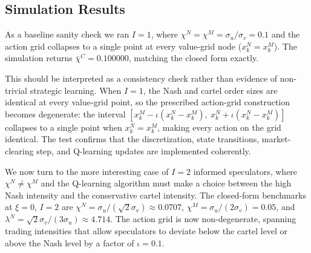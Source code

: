 \documentclass[11pt]{article}
\begin{document}
\subsection{Simulation Results}
As a baseline sanity check we ran $I=1$, where $\chi^N=\chi^M=\sigma_u/\sigma_v=0.1$ 
and the action grid collapses to a single point at every value-grid node 
($x_k^N=x_k^M$). The simulation returns $\bar\chi^C=0.100000$, matching the 
closed form exactly.

This should be interpreted as a consistency check rather than evidence 
of non-trivial strategic learning. When $I=1$, the Nash and cartel order sizes 
are identical at every value-grid point, so the prescribed action-grid 
construction becomes degenerate: the interval $[x_k^M - \iota(x_k^N - x_k^M),\ 
x_k^N + \iota(x_k^N - x_k^M)]$ collapses to a single point when $x_k^N = x_k^M$, 
making every action on the grid identical. The test confirms that the discretization, state transitions, market-clearing step, and Q-learning updates are implemented coherently.

We now turn to the more interesting case of $I=2$ informed speculators,
where $\chi^N \neq \chi^M$ and the Q-learning algorithm must make a
choice between the high Nash intensity and the conservative cartel
intensity. The closed-form benchmarks at $\xi=0$, $I=2$ are
$\chi^N = \sigma_u/(\sqrt{2}\sigma_v) \approx 0.0707$,
$\chi^M = \sigma_u/(2\sigma_v) = 0.05$, and
$\lambda^N = \sqrt{2}\sigma_v/(3\sigma_u) \approx 4.714$. The action grid is now
non-degenerate, spanning trading intensities that allow speculators to deviate
below the cartel level or above the Nash level by a factor of $\iota = 0.1$.
\end{document}
